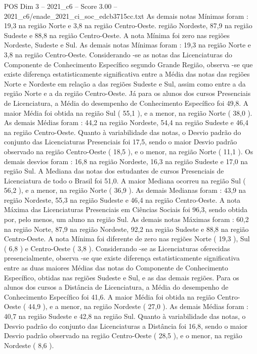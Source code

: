 \begin{textsample}{POS Dim 3 – 2021\_c6 – Score 3.00 – 2021\_c6/enade\_2021\_ci\_soc\_edcb3715cc.txt}
As demais notas Mínimas foram : 19,3 na região Norte e 3,8 na região Centro-Oeste. região Nordeste, 87,9 na região Sudeste e 88,8 na região Centro-Oeste.
A nota Mínima foi zero nas regiões Nordeste, Sudeste e Sul.
As demais notas Mínimas foram : 19,3 na região Norte e 3,8 na região Centro-Oeste.
Considerando -se as notas das Licenciaturas do Componente de Conhecimento Específico segundo Grande Região, observa -se que existe diferença estatisticamente significativa entre a Média das notas das regiões Norte e Nordeste em relação a das regiões Sudeste e Sul, assim como entre a da região Norte e a da região Centro-Oeste.
Já para os alunos dos cursos Presenciais de Licenciatura, a Média do desempenho de Conhecimento Específico foi 49,8.
A maior Média foi obtida na região Sul ( 55,1 ), e a menor, na região Norte ( 38,0 ).
As demais Médias foram : 44,2 na região Nordeste, 54,4 na região Sudeste e 46,4 na região Centro-Oeste.
Quanto à variabilidade das notas, o Desvio padrão do conjunto das Licenciaturas Presenciais foi 17,5, sendo o maior Desvio padrão observado na região Centro-Oeste ( 18,5 ), e o menor, na região Norte ( 11,1 ).
Os demais desvios foram : 16,8 na região Nordeste, 16,3 na região Sudeste e 17,0 na região Sul.
A Mediana das notas dos estudantes de cursos Presenciais de Licenciatura de todo o Brasil foi 51,0.
A maior Mediana ocorreu na região Sul ( 56,2 ), e a menor, na região Norte ( 36,9 ).
As demais Medianas foram : 43,9 na região Nordeste, 55,3 na região Sudeste e 46,4 na região Centro-Oeste.
A nota Máxima das Licenciaturas Presenciais em Ciências Sociais foi 96,3, sendo obtida por, pelo menos, um aluno na região Sul.
As demais notas Máximas foram : 60,2 na região Norte, 87,9 na região Nordeste, 92,2 na região Sudeste e 88,8 na região Centro-Oeste.
A nota Mínima foi diferente de zero nas regiões Norte ( 19,3 ), Sul ( 6,8 ) e Centro-Oeste ( 3,8 ).
Considerando -se as Licenciaturas oferecidas presencialmente, observa -se que existe diferença estatisticamente significativa entre as duas maiores Médias das notas do Componente de Conhecimento Específico, obtidas nas regiões Sudeste e Sul, e as das demais regiões.
Para os alunos dos cursos a Distância de Licenciatura, a Média do desempenho de Conhecimento Específico foi 41,6.
A maior Média foi obtida na região Centro-Oeste ( 44,9 ), e a menor, na região Nordeste ( 27,0 ).
As demais Médias foram : 40,7 na região Sudeste e 42,8 na região Sul.
Quanto à variabilidade das notas, o Desvio padrão do conjunto das Licenciaturas a Distância foi 16,8, sendo o maior Desvio padrão observado na região Centro-Oeste ( 28,5 ), e o menor, na região Nordeste ( 8,6 ).

\end{textsample}
